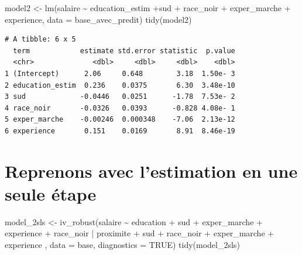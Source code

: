 \documentclass[
  letterpaper,
  DIV=11,
  numbers=noendperiod]{scrartcl}
\newenvironment{Shaded}{\begin{snugshade}}{\end{snugshade}}
\newcommand{\AttributeTok}[1]{\textcolor[rgb]{0.40,0.45,0.13}{#1}}
\newcommand{\ConstantTok}[1]{\textcolor[rgb]{0.56,0.35,0.01}{#1}}
\newcommand{\FunctionTok}[1]{\textcolor[rgb]{0.28,0.35,0.67}{#1}}
\newcommand{\NormalTok}[1]{\textcolor[rgb]{0.00,0.23,0.31}{#1}}
\newcommand{\OtherTok}[1]{\textcolor[rgb]{0.00,0.23,0.31}{#1}}
\newcommand{\SpecialCharTok}[1]{\textcolor[rgb]{0.37,0.37,0.37}{#1}}
\begin{document}
\begin{Shaded}
\begin{Highlighting}[]
\NormalTok{model2 }\OtherTok{\textless{}{-}} \FunctionTok{lm}\NormalTok{(salaire }\SpecialCharTok{\textasciitilde{}}\NormalTok{ education\_estim }\SpecialCharTok{+}\NormalTok{sud }\SpecialCharTok{+}\NormalTok{ race\_noir }\SpecialCharTok{+}\NormalTok{ exper\_marche }\SpecialCharTok{+}\NormalTok{ experience,}
                   \AttributeTok{data =}\NormalTok{ base\_avec\_predit)}
\FunctionTok{tidy}\NormalTok{(model2)}
\end{Highlighting}
\end{Shaded}

\begin{verbatim}
# A tibble: 6 x 5
  term            estimate std.error statistic  p.value
  <chr>              <dbl>     <dbl>     <dbl>    <dbl>
1 (Intercept)      2.06     0.648        3.18  1.50e- 3
2 education_estim  0.236    0.0375       6.30  3.48e-10
3 sud             -0.0446   0.0251      -1.78  7.53e- 2
4 race_noir       -0.0326   0.0393      -0.828 4.08e- 1
5 exper_marche    -0.00246  0.000348    -7.06  2.13e-12
6 experience       0.151    0.0169       8.91  8.46e-19
\end{verbatim}

\section{Reprenons avec l'estimation en une seule
étape}\label{reprenons-avec-lestimation-en-une-seule-uxe9tape}

\begin{Shaded}
\begin{Highlighting}[]
\NormalTok{model\_2sls }\OtherTok{\textless{}{-}} \FunctionTok{iv\_robust}\NormalTok{(salaire }\SpecialCharTok{\textasciitilde{}}\NormalTok{ education }\SpecialCharTok{+}\NormalTok{ sud  }\SpecialCharTok{+}\NormalTok{ exper\_marche }\SpecialCharTok{+}\NormalTok{ experience }\SpecialCharTok{+}\NormalTok{ race\_noir  }\SpecialCharTok{|}
\NormalTok{                            proximite }\SpecialCharTok{+}\NormalTok{ sud }\SpecialCharTok{+}\NormalTok{ race\_noir }\SpecialCharTok{+}\NormalTok{ exper\_marche }\SpecialCharTok{+}\NormalTok{ experience ,}
                        \AttributeTok{data =}\NormalTok{ base, }\AttributeTok{diagnostics =} \ConstantTok{TRUE}\NormalTok{)}
\FunctionTok{tidy}\NormalTok{(model\_2sls)}
\end{Highlighting}
\end{Shaded}
\end{document}
